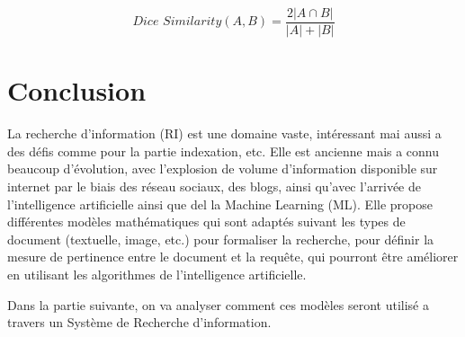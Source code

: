 \[
    \textit{Dice Similarity}(A, B) = \frac{2 |A \cap B|}{|A| + |B|}
\]

\section{Conclusion}
La recherche d'information (RI) est une domaine vaste, intéressant mai aussi a des défis comme pour la partie indexation, etc. Elle est ancienne mais a connu beaucoup d'évolution, avec l'explosion de volume d'information disponible sur internet par le biais des réseau sociaux, des blogs, ainsi qu'avec l'arrivée de l'intelligence artificielle ainsi que del la Machine Learning (ML). Elle propose différentes modèles mathématiques qui sont adaptés suivant les types de document (textuelle, image, etc.) pour formaliser la recherche, pour définir la mesure de pertinence entre le document et la requête, qui pourront être améliorer en utilisant les algorithmes de l'intelligence artificielle.

Dans la partie suivante, on va analyser comment ces modèles seront utilisé a travers un Système de Recherche d'information.